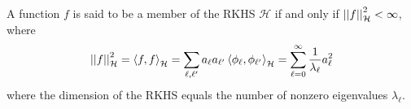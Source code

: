 \documentclass[11pt]{article}
\newcommand\mc{\mathcal}
\begin{document}
A function $f$ is said to be a member of the RKHS $\mc H$ if and only if $\norm[\mc H]{f}^2 < \infty$, where
\begin{align}
	\norm[\mc H]{f}^2 = \innerprod{f}{f}_{\mc H} = \sum_{\ell, \ell'} a_{\ell} a_{\ell'} \innerprod{\phi_{\ell}}{\phi_{\ell'}}_{\mc H}
	= \sum_{\ell = 0}^{\infty} \inv{\lambda_{\ell}} a_{\ell}^2
\end{align}
where the dimension of the RKHS equals the number of nonzero eigenvalues $\lambda_{\ell}$. 
\end{document}
